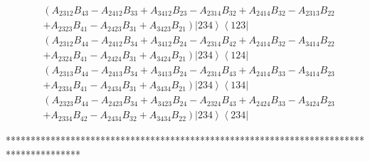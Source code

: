 \documentclass[aps,preprint]{revtex4}%
\begin{document}
\begin{align}
&  \left(  A_{2312}B_{43}-A_{2412}B_{33}+A_{3412}B_{23}-A_{2314}%
B_{32}+A_{2414}B_{32}-A_{2313}B_{22}\right.  \nonumber\\
&  \left.  +A_{2323}B_{41}-A_{2423}B_{31}+A_{3423}B_{21}\right)  \left\vert
234\right\rangle \left\langle 123\right\vert \nonumber\\
&  \left(  A_{2312}B_{44}-A_{2412}B_{34}+A_{3412}B_{24}-A_{2314}%
B_{42}+A_{2414}B_{32}-A_{3414}B_{22}\right.  \nonumber\\
&  \left.  +A_{2324}B_{41}-A_{2424}B_{31}+A_{3424}B_{21}\right)  \left\vert
234\right\rangle \left\langle 124\right\vert \nonumber\\
&  \left(  A_{2313}B_{44}-A_{2413}B_{34}+A_{3413}B_{24}-A_{2314}%
B_{43}+A_{2414}B_{33}-A_{3414}B_{23}\right.  \nonumber\\
&  \left.  +A_{2334}B_{41}-A_{2434}B_{31}+A_{3434}B_{21}\right)  \left\vert
234\right\rangle \left\langle 134\right\vert \nonumber\\
&  \left(  A_{2323}B_{44}-A_{2423}B_{34}+A_{3423}B_{24}-A_{2324}%
B_{43}+A_{2424}B_{33}-A_{3424}B_{23}\right.  \nonumber\\
&  \left.  +A_{2334}B_{42}-A_{2434}B_{32}+A_{3434}B_{22}\right)  \left\vert
234\right\rangle \left\langle 234\right\vert
\end{align}


***************************************************************************************%
\end{document}
